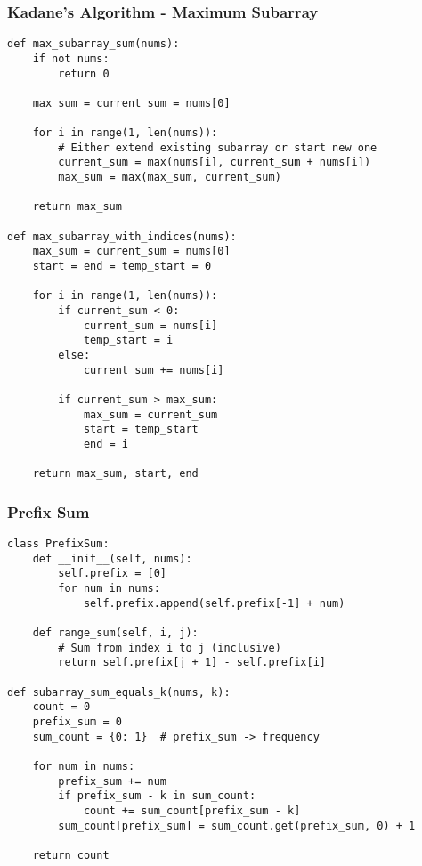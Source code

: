 \documentclass[10pt,a4paper]{article}
\begin{document}
\subsubsection{Kadane's Algorithm - Maximum Subarray}
\begin{lstlisting}
def max_subarray_sum(nums):
    if not nums:
        return 0

    max_sum = current_sum = nums[0]

    for i in range(1, len(nums)):
        # Either extend existing subarray or start new one
        current_sum = max(nums[i], current_sum + nums[i])
        max_sum = max(max_sum, current_sum)

    return max_sum

def max_subarray_with_indices(nums):
    max_sum = current_sum = nums[0]
    start = end = temp_start = 0

    for i in range(1, len(nums)):
        if current_sum < 0:
            current_sum = nums[i]
            temp_start = i
        else:
            current_sum += nums[i]

        if current_sum > max_sum:
            max_sum = current_sum
            start = temp_start
            end = i

    return max_sum, start, end
\end{lstlisting}

\subsubsection{Prefix Sum}
\begin{lstlisting}
class PrefixSum:
    def __init__(self, nums):
        self.prefix = [0]
        for num in nums:
            self.prefix.append(self.prefix[-1] + num)

    def range_sum(self, i, j):
        # Sum from index i to j (inclusive)
        return self.prefix[j + 1] - self.prefix[i]

def subarray_sum_equals_k(nums, k):
    count = 0
    prefix_sum = 0
    sum_count = {0: 1}  # prefix_sum -> frequency

    for num in nums:
        prefix_sum += num
        if prefix_sum - k in sum_count:
            count += sum_count[prefix_sum - k]
        sum_count[prefix_sum] = sum_count.get(prefix_sum, 0) + 1

    return count
\end{lstlisting}
\end{document}
